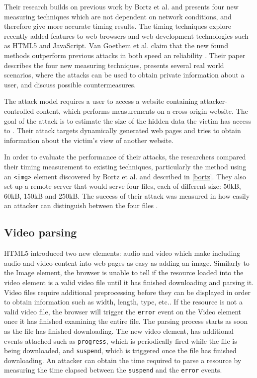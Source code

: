 \documentclass[10pt,a4paper,twoside]{book}
\begin{document}
Their research builds on previous work by Bortz et al.\cite{bortz2007exposing} and presents four new measuring techniques which are not dependent on network conditions, and therefore give more accurate timing results. The timing techniques explore recently added features to web browsers and web development technologies such as HTML5 and JavaScript. Van Goethem et al. claim that the new found methods outperform previous attacks in both speed an reliability \cite{van2015clock}. Their paper describes the four new measuring techniques, presents several real world scenarios, where the attacks can be used to obtain private information about a user, and discuss possible countermeasures.

The attack model requires a user to access a website containing attacker- controlled content, which performs measurements on a cross-origin website. The goal of the attack is to estimate the size of the hidden data the victim has access to \cite{van2015clock}. Their attack targets dynamically generated web pages and tries to obtain information about the victim's view of another website. 

In order to evaluate the performance of their attacks, the researchers compared their timing measurement to existing techniques, particularly the method using an \texttt{<img>} element discovered by Bortz et al. and described in \ref{bortz}. They also set up a remote server that would serve four files, each of different size: 50kB, 60kB, 150kB and 250kB. The success of their attack was measured in how easily an attacker can distinguish between the four files \cite{van2015clock}.

\subsection{Video parsing}
HTML5 introduced two new elements: audio and video which make including audio and video content into web pages as easy as adding an image. Similarly to the Image element, the browser is unable to tell if the resource loaded into the video element is a valid video file until it has finished downloading and parsing it. Video files require additional preprocessing before they can be displayed in order to obtain information such as width, length, type, etc.. If the resource is not a valid video file, the browser will trigger the \texttt{error} event on the Video element once it has finished examining the entire file. The parsing process starts as soon as the file has finished downloading. The new video element, has additional events attached such as \texttt{progress}, which is periodically fired while the file is being downloaded, and \texttt{suspend}, which is triggered once the file has finished downloading. An attacker can obtain the time required to parse a resource by measuring the time elapsed between the \texttt{suspend} and the \texttt{error} events.
\end{document}
